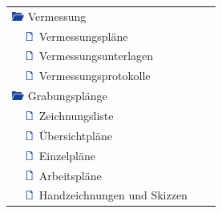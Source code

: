 \begin{center}
\begin{longtable}{l l l l}
		\multicolumn{2}{l}{\includegraphics[width=0.4cm]{bilder/OrdnerIconAuf.png} \hspace*{0.04cm} Vermessung}\\
	    & \includegraphics[width=0.4cm]{bilder/DateiIcon.png} \hspace*{0.04cm} Vermessungspläne\\
		& \includegraphics[width=0.4cm]{bilder/DateiIcon.png} \hspace*{0.04cm} Vermessungsunterlagen\\
		& \includegraphics[width=0.4cm]{bilder/DateiIcon.png} \hspace*{0.04cm} Vermessungsprotokolle\\
		
		\multicolumn{2}{l}{\includegraphics[width=0.4cm]{bilder/OrdnerIconAuf.png} \hspace*{0.04cm} Grabungsplänge}\\
	    & \includegraphics[width=0.4cm]{bilder/DateiIcon.png} \hspace*{0.04cm} Zeichnungsliste\\
		& \includegraphics[width=0.4cm]{bilder/DateiIcon.png} \hspace*{0.04cm} Übersichtpläne\\
		& \includegraphics[width=0.4cm]{bilder/DateiIcon.png} \hspace*{0.04cm} Einzelpläne\\
		& \includegraphics[width=0.4cm]{bilder/DateiIcon.png} \hspace*{0.04cm} Arbeitspläne\\
		& \includegraphics[width=0.4cm]{bilder/DateiIcon.png} \hspace*{0.04cm} Handzeichnungen und Skizzen\\
		

\end{longtable}
\end{center}
